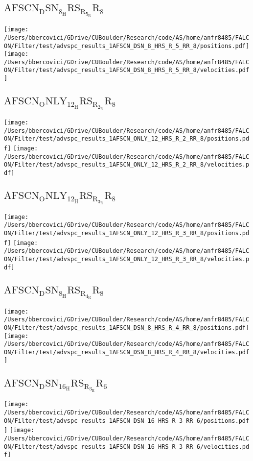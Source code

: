 \subsection{$\mathrm{AFSCN_DSN_8_HRS_R_5_RR_8}$}
\texttt{[image: /Users/bbercovici/GDrive/CUBoulder/Research/code/AS/home/anfr8485/FALCON/Filter/test/advspc\_results\_1AFSCN\_DSN\_8\_HRS\_R\_5\_RR\_8/positions.pdf]}
\texttt{[image: /Users/bbercovici/GDrive/CUBoulder/Research/code/AS/home/anfr8485/FALCON/Filter/test/advspc\_results\_1AFSCN\_DSN\_8\_HRS\_R\_5\_RR\_8/velocities.pdf]}
\subsection{$\mathrm{AFSCN_ONLY_12_HRS_R_2_RR_8}$}
\texttt{[image: /Users/bbercovici/GDrive/CUBoulder/Research/code/AS/home/anfr8485/FALCON/Filter/test/advspc\_results\_1AFSCN\_ONLY\_12\_HRS\_R\_2\_RR\_8/positions.pdf]}
\texttt{[image: /Users/bbercovici/GDrive/CUBoulder/Research/code/AS/home/anfr8485/FALCON/Filter/test/advspc\_results\_1AFSCN\_ONLY\_12\_HRS\_R\_2\_RR\_8/velocities.pdf]}
\subsection{$\mathrm{AFSCN_ONLY_12_HRS_R_3_RR_8}$}
\texttt{[image: /Users/bbercovici/GDrive/CUBoulder/Research/code/AS/home/anfr8485/FALCON/Filter/test/advspc\_results\_1AFSCN\_ONLY\_12\_HRS\_R\_3\_RR\_8/positions.pdf]}
\texttt{[image: /Users/bbercovici/GDrive/CUBoulder/Research/code/AS/home/anfr8485/FALCON/Filter/test/advspc\_results\_1AFSCN\_ONLY\_12\_HRS\_R\_3\_RR\_8/velocities.pdf]}
\subsection{$\mathrm{AFSCN_DSN_8_HRS_R_4_RR_8}$}
\texttt{[image: /Users/bbercovici/GDrive/CUBoulder/Research/code/AS/home/anfr8485/FALCON/Filter/test/advspc\_results\_1AFSCN\_DSN\_8\_HRS\_R\_4\_RR\_8/positions.pdf]}
\texttt{[image: /Users/bbercovici/GDrive/CUBoulder/Research/code/AS/home/anfr8485/FALCON/Filter/test/advspc\_results\_1AFSCN\_DSN\_8\_HRS\_R\_4\_RR\_8/velocities.pdf]}
\subsection{$\mathrm{AFSCN_DSN_16_HRS_R_3_RR_6}$}
\texttt{[image: /Users/bbercovici/GDrive/CUBoulder/Research/code/AS/home/anfr8485/FALCON/Filter/test/advspc\_results\_1AFSCN\_DSN\_16\_HRS\_R\_3\_RR\_6/positions.pdf]}
\texttt{[image: /Users/bbercovici/GDrive/CUBoulder/Research/code/AS/home/anfr8485/FALCON/Filter/test/advspc\_results\_1AFSCN\_DSN\_16\_HRS\_R\_3\_RR\_6/velocities.pdf]}
